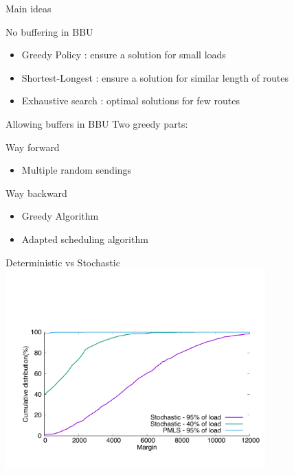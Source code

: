 \documentclass[10 pt]{beamer}
\begin{document}
\begin{frame}{Main ideas}

\begin{block}{No buffering in BBU}
\begin{itemize}
\item Greedy Policy : ensure a solution for small loads
\item Shortest-Longest : ensure a solution for similar length of routes
\item Exhaustive search : optimal solutions for few routes
\end{itemize}

\end{block}

\begin{block}{Allowing buffers in BBU}
Two greedy parts: 

 \begin{multicols}{2}
 Way forward
\begin{itemize}
\item Multiple random sendings
\end{itemize}
\vspace{0.5cm}
Way backward
\begin{itemize}
\item Greedy Algorithm
\item Adapted scheduling algorithm
\end{itemize}
\end{multicols}
\vspace{1cm}
\end{block}

\end{frame}

\begin{frame}{Deterministic vs Stochastic}
\centering
\includegraphics [width=100mm]{stochastic.pdf}
\end{frame}
\end{document}
